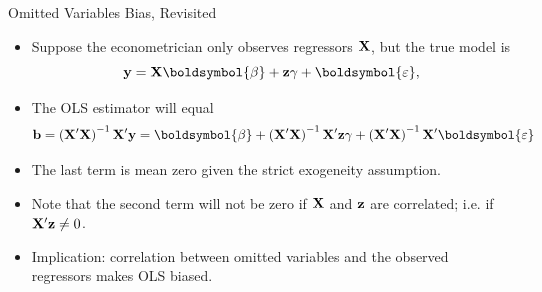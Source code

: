 \documentclass[aspectratio=169,11pt]{beamer}
\begin{document}


\begin{frame}{Omitted Variables Bias, Revisited}
\begin{itemize}
	\item Suppose the econometrician only observes regressors ${\bf X} $, but the true model is\[
			{\bf y}= {\bf X} \boldsymbol{\beta} + {\bf z} \gamma + \boldsymbol{\varepsilon},
	\]

	\item The OLS estimator will equal\[
	{\bf b} = \left({\bf X}'{\bf X}\right)^{-1} {\bf X}' {\bf y} = \boldsymbol{\beta}  + \left({\bf X}'{\bf X}\right)^{-1} {\bf X}' {\bf z} \gamma + \left({\bf X}'{\bf X}\right)^{-1} {\bf X}' \boldsymbol{\varepsilon}
	\]

	\item The last term is mean zero given the strict exogeneity assumption.

	\item Note that the second term will not be zero if ${\bf X}$ and ${\bf z}$ are correlated;
	i.e. if $ {\bf X}' {\bf z} \ne 0$.

	\item Implication:  correlation between omitted variables and the observed regressors makes OLS biased.
\end{itemize}
\end{frame}
\end{document}
